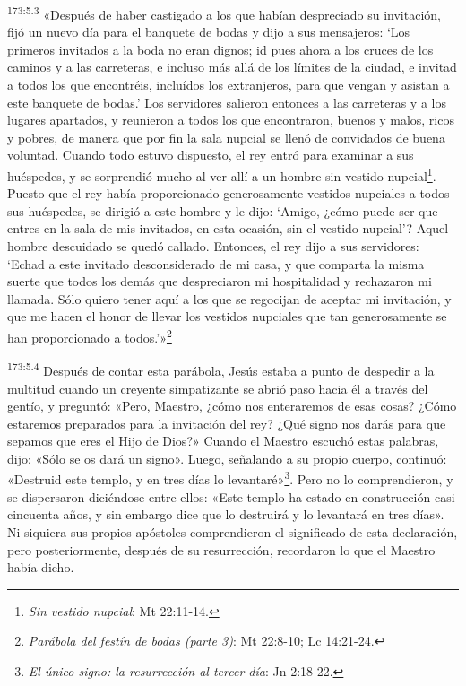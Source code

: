 \par
\textsuperscript{173:5.3} «Después de haber castigado a los que habían despreciado su invitación, fijó un nuevo día para el banquete de bodas y dijo a sus mensajeros: `Los primeros invitados a la boda no eran dignos; id pues ahora a los cruces de los caminos y a las carreteras, e incluso más allá de los límites de la ciudad, e invitad a todos los que encontréis, incluídos los extranjeros, para que vengan y asistan a este banquete de bodas.' Los servidores salieron entonces a las carreteras y a los lugares apartados, y reunieron a todos los que encontraron, buenos y malos, ricos y pobres, de manera que por fin la sala nupcial se llenó de convidados de buena voluntad. Cuando todo estuvo dispuesto, el rey entró para examinar a sus huéspedes, y se sorprendió mucho al ver allí a un hombre sin vestido nupcial\footnote{\textit{Sin vestido nupcial}: Mt 22:11-14.}. Puesto que el rey había proporcionado generosamente vestidos nupciales a todos sus huéspedes, se dirigió a este hombre y le dijo: `Amigo, ¿cómo puede ser que entres en la sala de mis invitados, en esta ocasión, sin el vestido nupcial'? Aquel hombre descuidado se quedó callado. Entonces, el rey dijo a sus servidores: `Echad a este invitado desconsiderado de mi casa, y que comparta la misma suerte que todos los demás que despreciaron mi hospitalidad y rechazaron mi llamada. Sólo quiero tener aquí a los que se regocijan de aceptar mi invitación, y que me hacen el honor de llevar los vestidos nupciales que tan generosamente se han proporcionado a todos.'»\footnote{\textit{Parábola del festín de bodas (parte 3)}: Mt 22:8-10; Lc 14:21-24.}

\par
\textsuperscript{173:5.4} Después de contar esta parábola, Jesús estaba a punto de despedir a la multitud cuando un creyente simpatizante se abrió paso hacia él a través del gentío, y preguntó: «Pero, Maestro, ¿cómo nos enteraremos de esas cosas? ¿Cómo estaremos preparados para la invitación del rey? ¿Qué signo nos darás para que sepamos que eres el Hijo de Dios?» Cuando el Maestro escuchó estas palabras, dijo: «Sólo se os dará un signo». Luego, señalando a su propio cuerpo, continuó: «Destruid este templo, y en tres días lo levantaré»\footnote{\textit{El único signo: la resurrección al tercer día}: Jn 2:18-22.}. Pero no lo comprendieron, y se dispersaron diciéndose entre ellos: «Este templo ha estado en construcción casi cincuenta años, y sin embargo dice que lo destruirá y lo levantará en tres días». Ni siquiera sus propios apóstoles comprendieron el significado de esta declaración, pero posteriormente, después de su resurrección, recordaron lo que el Maestro había dicho.

